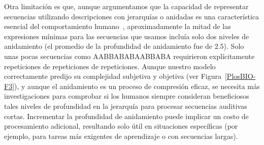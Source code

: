 
Otra limitación es que, aunque argumentamos que la capacidad de representar secuencias utilizando descripciones con jerarquías o anidadas es una característica esencial del comportamiento humano~\cite{f4}, aproximadamente la mitad de las expresiones mínimas para las secuencias que usamos incluía solo dos niveles de anidamiento (el promedio de la profundidad de anidamiento fue de $2.5$). Solo unas pocas secuencias como AABBABABAABBABA requirieron explícitamente repeticiones de repeticiones de repeticiones. Aunque nuestro modelo correctamente predijo su complejidad subjetiva y objetiva (ver Figura~\ref{PlosBIO-F3}), y aunque el anidamiento es un proceso de compresión eficaz, se necesita más investigaciones para comprobar si los humanos siempre consideran beneficiosos tales niveles de profundidad en la jerarquía para procesar secuencias auditivas cortas. Incrementar la profundidad de anidamiento puede implicar un costo de procesamiento adicional, resultando solo útil en situaciones específicas (por ejemplo, para tareas más exigentes de aprendizaje o con secuencias largas).

